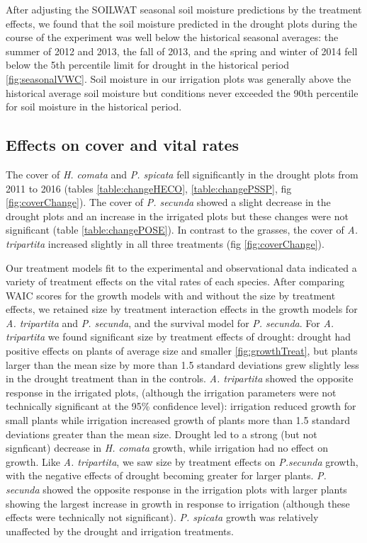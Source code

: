 \documentclass[11pt]{article}
\begin{document}
\begin{doublespacing}
After adjusting the SOILWAT seasonal soil moisture predictions by the treatment effects, we found that the soil moisture predicted in the drought plots during the course of the experiment was well below the historical seasonal averages: the summer of 2012 and 2013, the fall of 2013, and the spring and winter of 2014 fell below the 5th percentile limit for drought in the historical period \ref{fig:seasonalVWC}. Soil moisture in our irrigation plots was generally above the historical average soil moisture but conditions never exceeded the 90th percentile for soil moisture in the historical period. 

\subsection*{Effects on cover and vital rates}

The cover of \textit{H. comata} and \textit{P. spicata} fell significantly in the drought plots from 2011 to 2016 (tables \ref{table:changeHECO}, \ref{table:changePSSP}, fig \ref{fig:coverChange}). The cover of \textit{P. secunda} showed a slight decrease in the drought plots and an increase in the irrigated plots but these changes were not significant (table \ref{table:changePOSE}).  In contrast to the grasses, the cover of \textit{A. tripartita} increased slightly in all three treatments (fig \ref{fig:coverChange}). 

Our treatment models fit to the experimental and observational data indicated a variety of treatment effects on the vital rates of each species. After comparing WAIC scores for the growth models with and without the size by treatment effects, we retained size by treatment interaction effects in the growth models for \textit{A. tripartita} and \textit{P. secunda}, and the survival model for \textit{P. secunda}. For \textit{A. tripartita} we found significant size by treatment effects of drought: drought had positive effects on plants of average size and smaller \ref{fig:growthTreat}, but plants larger than the mean size by more than 1.5 standard deviations grew slightly less in the drought treatment than in the controls. \textit{A. tripartita} showed the opposite response in the irrigated plots, (although the irrigation parameters were not technically significant at the 95\% confidence level): irrigation reduced growth for small plants while irrigation increased growth of plants more than 1.5 standard deviations greater than the mean size. Drought led to a strong (but not signficant) decrease in \textit{H. comata} growth, while irrigation had no effect on growth.  Like \textit{A. tripartita}, we saw size by treatment effects on \textit{P.secunda} growth, with the negative effects of drought becoming greater for larger plants. \textit{P. secunda} showed the opposite response in the irrigation plots with larger plants showing the largest increase in growth in response to irrigation (although these effects were technically not significant). \textit{P. spicata} growth was relatively unaffected by the drought and irrigation treatments. 


\end{doublespacing}
\end{document}
